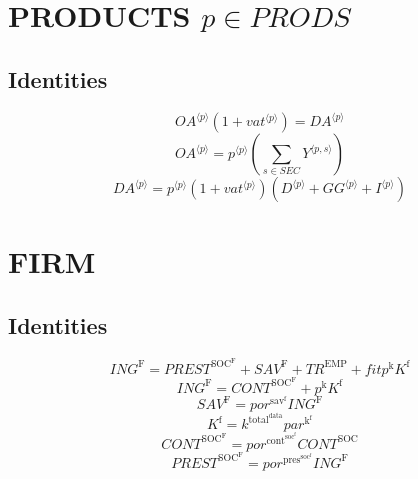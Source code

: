 \section{PRODUCTS $p\in {P\!R\!O\!D\!S}$}

\subsection{Identities}

\begin{equation}
{{{O\!A}}^{\langle p\rangle}} \left(1 + {{v\!a\!t}}^{\langle p\rangle}\right) = {{D\!A}}^{\langle p\rangle}
\end{equation}
\begin{equation}
{{O\!A}}^{\langle p\rangle} = {{p}^{\langle p\rangle}} \left(\sum_{s\in {S\!E\!C}} {Y}^{\langle p,s\rangle}\right)
\end{equation}
\begin{equation}
{{D\!A}}^{\langle p\rangle} = {{p}^{\langle p\rangle}} \left(1 + {{v\!a\!t}}^{\langle p\rangle}\right) \left({D}^{\langle p\rangle} + {{G\!G}}^{\langle p\rangle} + {I}^{\langle p\rangle}\right)
\end{equation}




\section{FIRM}

\subsection{Identities}

\begin{equation}
{I\!N\!G}^{\mathrm{F}} = {P\!R\!E\!S\!T}^{\mathrm{SOC}^{\mathrm{F}}} + {S\!A\!V}^{\mathrm{F}} + {T\!R}^{\mathrm{EMP}} + {{f\!i\!t}} {p^{\mathrm{k}}} {K^{\mathrm{f}}}
\end{equation}
\begin{equation}
{I\!N\!G}^{\mathrm{F}} = {C\!O\!N\!T}^{\mathrm{SOC}^{\mathrm{F}}} + {p^{\mathrm{k}}} {K^{\mathrm{f}}}
\end{equation}
\begin{equation}
{S\!A\!V}^{\mathrm{F}} = {{p\!o\!r}^{\mathrm{sav}^{\mathrm{f}}}} {{I\!N\!G}^{\mathrm{F}}}
\end{equation}
\begin{equation}
K^{\mathrm{f}} = {k^{\mathrm{total}^{\mathrm{data}}}} {{p\!a\!r}^{\mathrm{k}^{\mathrm{f}}}}
\end{equation}
\begin{equation}
{C\!O\!N\!T}^{\mathrm{SOC}^{\mathrm{F}}} = {{p\!o\!r}^{\mathrm{cont}^{\mathrm{soc}^{\mathrm{f}}}}} {{C\!O\!N\!T}^{\mathrm{SOC}}}
\end{equation}
\begin{equation}
{P\!R\!E\!S\!T}^{\mathrm{SOC}^{\mathrm{F}}} = {{p\!o\!r}^{\mathrm{pres}^{\mathrm{soc}^{\mathrm{f}}}}} {{I\!N\!G}^{\mathrm{F}}}
\end{equation}





